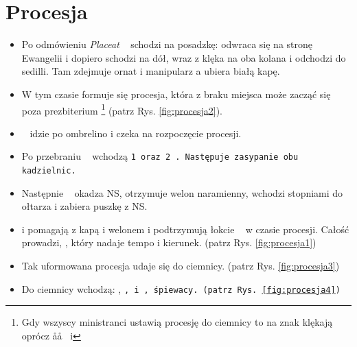 \section{Procesja}

\begin{itemize}
      \item Po odmówieniu \textit{Placeat} \ii~ schodzi na posadzkę: odwraca się
            na stronę Ewangelii i dopiero schodzi na dół, wraz z  klęka na
            oba kolana i odchodzi do sedilli. Tam zdejmuje ornat i manipularz a
            ubiera białą kapę.
      \item W tym czasie formuje się procesja, która z braku miejsca może zacząć
            się poza prezbiterium \footnote{Gdy wszyscy ministranci ustawią
                  procesję do ciemnicy to na znak  klękają oprócz \aa\aa~ i
                  } (patrz Rys. \ref{fig:procesja2}).
      \item \oo~ idzie po ombrelino i czeka na rozpoczęcie procesji.
      \item Po przebraniu \ii~ wchodzą \tt1 oraz \tt2 . Następuje zasypanie obu
            kadzielnic.
      \item Następnie \ii~ okadza NS, otrzymuje welon naramienny, wchodzi
            stopniami do ołtarza i zabiera puszkę z NS.
      \item {} i  pomagają z kapą i welonem i podtrzymują łokcie \ii~ w czasie
            procesji. Całość prowadzi, , który nadaje tempo i kierunek.
            (patrz Rys. \ref{fig:procesja1})
      \item Tak uformowana procesja udaje się do ciemnicy. (patrz Rys.
            \ref{fig:procesja3})
      \item Do ciemnicy wchodzą: \ii, \tt\tt,  i , śpiewacy. (patrz Rys.
            \ref{fig:procesja4})
\end{itemize}

